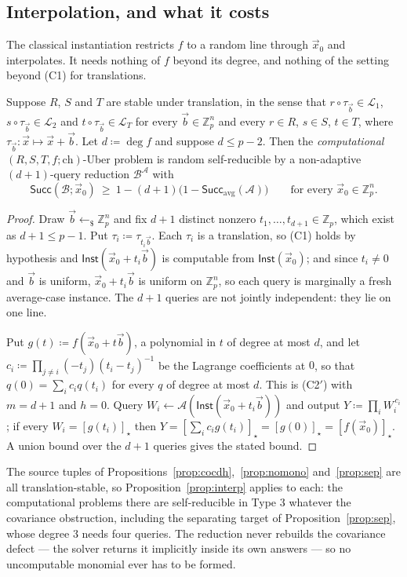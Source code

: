 \documentclass{aicr-solution}
\newcommand{\Zp}{\mathbb{Z}_p}
\newcommand{\vx}{\vec{x}}
\newcommand{\vb}{\vec{b}}
\newcommand{\Inst}{\mathsf{Inst}}
\newcommand{\Succ}{\mathsf{Succ}}
\newcommand{\LL}{\mathcal{L}}
\newcommand{\rsample}{\leftarrow_{\$}}
\newcommand{\ch}{\mathrm{ch}}
\begin{document}
\subsection{Interpolation, and what it costs}

The classical instantiation restricts $f$ to a random line through $\vx_0$ and interpolates.
It needs nothing of $f$ beyond its degree, and nothing of the setting beyond (C1) for
translations.

\begin{proposition}
\label{prop:interp}
Suppose $R$, $S$ and $T$ are stable under translation, in the sense that $r\circ\tau_{\vb}\in
\LL_1$, $s\circ\tau_{\vb}\in\LL_2$ and $t\circ\tau_{\vb}\in\LL_T$ for every $\vb\in\Zp^{n}$ and
every $r\in R$, $s\in S$, $t\in T$, where $\tau_{\vb}\colon\vx\mapsto\vx+\vb$. Let
$d\coloneqq\deg f$ and suppose $d\le p-2$. Then the \emph{computational}
$(R,S,T,f;\ch)$-Uber problem is random self-reducible by a non-adaptive $(d+1)$-query
reduction $\mathcal B^{\mathcal A}$ with
\[
  \Succ(\mathcal B;\vx_0)\ \ge\ 1-(d+1)\bigl(1-\Succ_{\mathrm{avg}}(\mathcal A)\bigr)
  \qquad\text{for every }\vx_0\in\Zp^{n}.
\]
\end{proposition}
\begin{proof}
Draw $\vb\rsample\Zp^{n}$ and fix $d+1$ distinct nonzero $t_1,\dots,t_{d+1}\in\Zp$, which exist
as $d+1\le p-1$. Put $\tau_i\coloneqq\tau_{t_i\vb}$. Each $\tau_i$ is a translation, so (C1)
holds by hypothesis and $\Inst(\vx_0+t_i\vb)$ is computable from $\Inst(\vx_0)$; and since
$t_i\neq 0$ and $\vb$ is uniform, $\vx_0+t_i\vb$ is uniform on $\Zp^{n}$, so each query is
marginally a fresh average-case instance. The $d+1$ queries are not jointly independent: they
lie on one line.

Put $g(t)\coloneqq f(\vx_0+t\vb)$, a polynomial in $t$ of degree at most $d$, and let
$c_i\coloneqq\prod_{j\neq i}(-t_j)(t_i-t_j)^{-1}$ be the Lagrange coefficients at $0$, so that
$q(0)=\sum_i c_i q(t_i)$ for every $q$ of degree at most $d$. This is (C2$'$) with $m=d+1$ and
$h=0$. Query $W_i\leftarrow\mathcal A(\Inst(\vx_0+t_i\vb))$ and output
$Y\coloneqq\prod_i W_i^{\,c_i}$; if every $W_i=[g(t_i)]_\star$ then
$Y=[\sum_i c_i g(t_i)]_\star=[g(0)]_\star=[f(\vx_0)]_\star$. A union bound over the $d+1$
queries gives the stated bound.
\end{proof}

The source tuples of Propositions~\ref{prop:cocdh},~\ref{prop:nomono} and~\ref{prop:sep} are
all translation-stable, so Proposition~\ref{prop:interp} applies to each: the computational
problems there are self-reducible in Type 3 whatever the covariance obstruction, including
the separating target of Proposition~\ref{prop:sep}, whose degree $3$ needs four queries. The
reduction never rebuilds the covariance defect --- the solver returns it implicitly inside its
own answers --- so no uncomputable monomial ever has to be formed.
\end{document}
